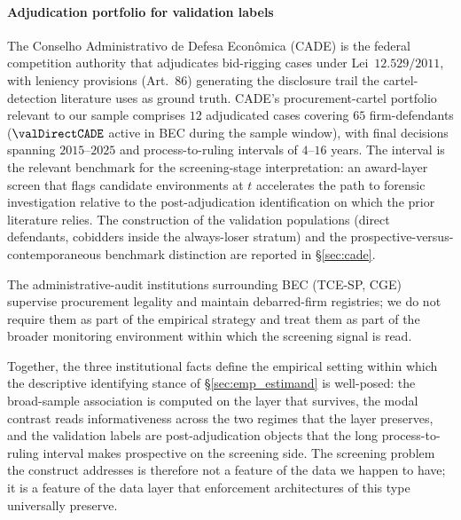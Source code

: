 \paragraph{Adjudication portfolio for validation labels}
The Conselho Administrativo de Defesa Econ\^omica (CADE) is the
federal competition authority that adjudicates bid-rigging cases
under Lei~$12.529/2011$, with leniency provisions (Art.~$86$)
generating the disclosure trail the cartel-detection literature
uses as ground truth. CADE's procurement-cartel portfolio
relevant to our sample comprises $12$ adjudicated cases covering
$65$ firm-defendants ($\valDirectCADE$ active in BEC during the
sample window), with final decisions spanning $2015$--$2025$ and
process-to-ruling intervals of $4$--$16$ years. The interval is
the relevant benchmark for the screening-stage interpretation:
an award-layer screen that flags candidate environments at $t$
accelerates the path to forensic investigation relative to the
post-adjudication identification on which the prior literature
relies. The construction of the validation populations
(direct defendants, cobidders inside the always-loser stratum)
and the prospective-versus-contemporaneous benchmark distinction
are reported in §\ref{sec:cade}.

The administrative-audit institutions surrounding BEC (TCE-SP,
CGE) supervise procurement legality and maintain debarred-firm
registries; we do not require them as part of the empirical
strategy and treat them as part of the broader monitoring
environment within which the screening signal is read.

Together, the three institutional facts define the empirical
setting within which the descriptive identifying stance of
\S\ref{sec:emp_estimand} is well-posed: the broad-sample
association is computed on the layer that survives, the modal
contrast reads informativeness across the two regimes that the
layer preserves, and the validation labels are post-adjudication
objects that the long process-to-ruling interval makes
prospective on the screening side. The screening problem the
construct addresses is therefore not a feature of the data we
happen to have; it is a feature of the data layer that
enforcement architectures of this type universally preserve.

